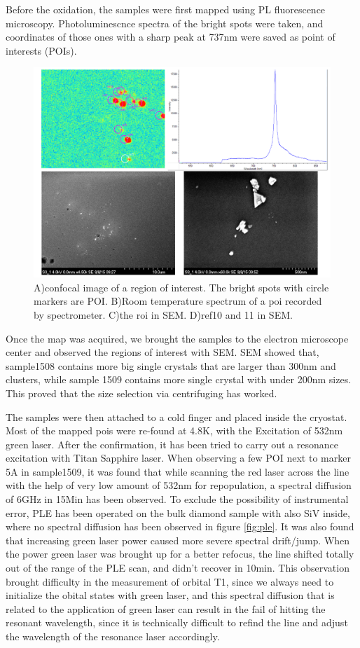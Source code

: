 Before the oxidation, the samples were first mapped using PL fluorescence microscopy. Photoluminescnce spectra of the bright spots were taken, and coordinates of those ones with a sharp peak at 737nm were saved as point of interests (POIs).
\begin{figure}[h]
\centering
\includegraphics[width=1\linewidth]{Figures/pic/RTPL}
\caption{A)confocal image of a region of interest. The bright spots with circle markers are POI. B)Room temperature spectrum of a poi recorded by spectrometer. C)the roi in SEM. D)ref10 and 11 in SEM.}
\label{fig:2015-09-07-ow-capture-20150907151210-744-1}
\end{figure}

Once the map was acquired, we brought the samples to the electron microscope center and observed the regions of interest with SEM. SEM showed that, sample1508 contains more big single crystals that are larger than 300nm and clusters, while sample 1509 contains more single crystal with under 200nm sizes. This proved that the size selection via centrifuging has worked.
 
The samples were then attached to a cold finger and placed inside the cryostat. Most of the mapped pois were re-found at 4.8K, with the Excitation of 532nm green laser. After the confirmation, it has been tried to carry out a resonance excitation with Titan Sapphire laser. When observing a few POI next to marker 5A in sample1509, it was found that while scanning the red laser across the line with the help of very low amount of 532nm for repopulation, a spectral diffusion of 6GHz in 15Min has been observed. To exclude the possibility of instrumental error, PLE has been operated on the bulk diamond sample with also SiV inside, where no spectral diffusion has been observed in figure \ref{fig:ple}. It was also found that increasing green laser power caused more severe spectral drift/jump. When the power green laser was brought up for a better refocus, the line shifted totally out of the range of the PLE scan, and didn't recover in 10min. This observation brought difficulty in the measurement of orbital T1, since we always need to initialize the obital states with green laser, and this spectral diffusion that is related to the application of green laser can result in the fail of hitting the resonant wavelength, since it is technically difficult to refind the line and adjust the wavelength of the resonance laser accordingly. 

